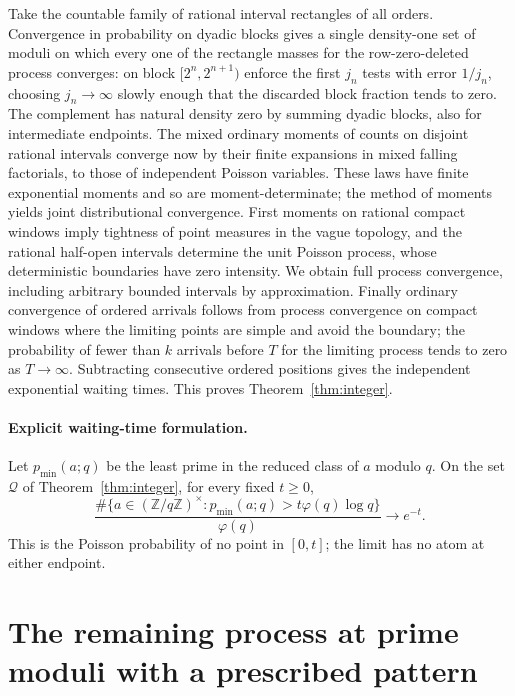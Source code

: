 \documentclass[11pt]{article}
\newcommand{\1}{\mathbf{1}}
\begin{document}
Take the countable family of rational interval rectangles of all orders. Convergence in probability on dyadic blocks gives a single density-one set of moduli on which every one of the rectangle masses for the row-zero-deleted process converges: on block $[2^n,2^{n+1})$ enforce the first $j_n$ tests with error $1/j_n$, choosing $j_n\to\infty$ slowly enough that the discarded block fraction tends to zero. The complement has natural density zero by summing dyadic blocks, also for intermediate endpoints. The mixed ordinary moments of counts on disjoint rational intervals converge now by their finite expansions in mixed falling factorials, to those of independent Poisson variables. These laws have finite exponential moments and so are moment-determinate; the method of moments yields joint distributional convergence. First moments on rational compact windows imply tightness of point measures in the vague topology, and the rational half-open intervals determine the unit Poisson process, whose deterministic boundaries have zero intensity. We obtain full process convergence, including arbitrary bounded intervals by approximation. Finally ordinary convergence of ordered arrivals follows from process convergence on compact windows where the limiting points are simple and avoid the boundary; the probability of fewer than $k$ arrivals before $T$ for the limiting process tends to zero as $T\to\infty$. Subtracting consecutive ordered positions gives the independent exponential waiting times. This proves Theorem~\ref{thm:integer}.

\paragraph{Explicit waiting-time formulation.}
Let $p_{\min}(a;q)$ be the least prime in the reduced class of $a$
modulo $q$. On the set $\mathcal Q$ of Theorem~\ref{thm:integer},
for every fixed $t\ge0$,
\[
 \frac{\#\{a\in(\mathbb Z/q\mathbb Z)^\times:
       p_{\min}(a;q)>t\varphi(q)\log q\}}{\varphi(q)}
 \longrightarrow e^{-t}.
\]
This is the Poisson probability of no point in $[0,t]$; the limit
has no atom at either endpoint.

\section{The remaining process at prime moduli with a prescribed pattern}
\end{document}
